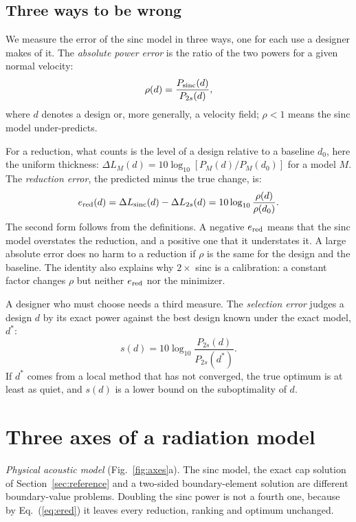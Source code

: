 \documentclass[preprint,12pt]{elsarticle}
\begin{document}
\subsection{Three ways to be wrong}
\label{sec:errors}
We measure the error of the sinc model in three ways, one for each use a designer makes of it. The \emph{absolute power error} is the ratio of the two powers for a given normal velocity:
\begin{equation}
 \rho(d)=\frac{P_{\rm sinc}(d)}{P_{2s}(d)},
\end{equation}
where $d$ denotes a design or, more generally, a velocity field; $\rho<1$ means the sinc model under-predicts.

For a reduction, what counts is the level of a design relative to a baseline $d_0$, here the uniform thickness: $\Delta L_M(d)=10\log_{10}[P_M(d)/P_M(d_0)]$ for a model $M$. The \emph{reduction error}, the predicted minus the true change, is:
\begin{equation}
 e_{\rm red}(d)=\Delta L_{\rm sinc}(d)-\Delta L_{2s}(d)=10\log_{10}\frac{\rho(d)}{\rho(d_0)} .
 \label{eq:ered}
\end{equation}
The second form follows from the definitions. A negative $e_{\rm red}$ means that the sinc model overstates the reduction, and a positive one that it understates it. A large absolute error does no harm to a reduction if $\rho$ is the same for the design and the baseline. The identity also explains why $2\times$ sinc is a calibration: a constant factor changes $\rho$ but neither $e_{\rm red}$ nor the minimizer.

A designer who must choose needs a third measure. The \emph{selection error} judges a design $d$ by its exact power against the best design known under the exact model, $d^\ast$:
\begin{equation}
 s(d)=10\log_{10}\frac{P_{2s}(d)}{P_{2s}(d^\ast)} .
 \label{eq:sel}
\end{equation}
If $d^\ast$ comes from a local method that has not converged, the true optimum is at least as quiet, and $s(d)$ is a lower bound on the suboptimality of $d$.

\section{Three axes of a radiation model}
\label{sec:axes}
\emph{Physical acoustic model} (Fig.~\ref{fig:axes}a). The sinc model, the exact cap solution of Section~\ref{sec:reference} and a two-sided boundary-element solution are different boundary-value problems. Doubling the sinc power is not a fourth one, because by Eq.~(\ref{eq:ered}) it leaves every reduction, ranking and optimum unchanged.
\end{document}
